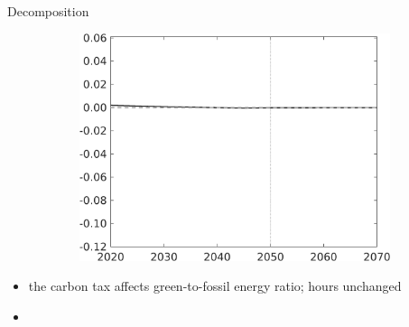 \documentclass[11pt,aspectratio=169]{beamer}
\begin{document}
\begin{frame}{Decomposition}
\begin{figure}[h!!]
\begin{subfigure}{0.4\textwidth}
		\includegraphics[width=1\textwidth]{../codding_model/own_basedOnFried/optimalPol_010922_revision/figures/all_13Sept22_Tplus30/CountTAUF_CTOPer_Opt_target_Hagg_nsk0_xgr0_knspil0_regime4_spillover0_sep0_extern0_PV1_etaa0.79.png}
	\end{subfigure}
\end{figure}
\vspace{3mm}
\begin{block}{}
	\begin{itemize}
		\item the carbon tax affects green-to-fossil energy ratio; hours unchanged
		\item[ ]\
	\end{itemize}
\end{block}	
\end{frame}
\end{document}
